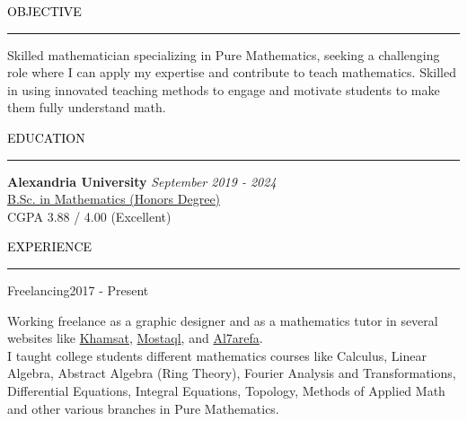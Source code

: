 \documentclass{resume} %
\renewenvironment{rSection}[1]{
\sectionskip
\textcolor{black}{\MakeUppercase{#1}}
\sectionlineskip
\hrule
\begin{list}{}{
\setlength{\leftmargin}{1.5em}
}
\item[]
}{
\end{list}
}
\begin{document}
\begin{rSection}{Objective}
     Skilled mathematician specializing in Pure Mathematics, seeking a challenging role where I can apply my expertise and contribute to teach mathematics. Skilled in using innovated teaching methods to engage and motivate students to make them fully understand math. 
\end{rSection}


\begin{rSection}{Education}
{\bf Alexandria University} \hfill {\em September 2019 - 2024} 
\\ \href{https://drive.google.com/file/d/1F50DDXvgqMtAoCs6Qjr5yMD2jWmPWW3m/view?usp=sharing}{\color{blue}B.Sc. in Mathematics (Honors Degree)} \hfill
\\ CGPA 3.88 / 4.00 (Excellent) \hfill
\end{rSection}



\begin{rSection}{Experience}
\begin{rSubsection}{Freelancing}{2017 - Present}{}{}
\item Working freelance as a graphic designer and as a mathematics tutor in several websites like \href{https://khamsat.com/user/hazem_hosam}{\color{blue}Khamsat}, \href{https://mostaql.com/u/Hazem_Hosam}{\color{blue}Mostaql}, 
 and \href{https://www.elharefa.com/en/freelancers/p/hazemhossam}{\color{blue}Al7arefa}.\\
 I taught college students different mathematics courses like Calculus, Linear Algebra, Abstract Algebra (Ring Theory), Fourier Analysis and Transformations, Differential Equations, Integral Equations, Topology, Methods of Applied Math and  other various branches in Pure Mathematics.
\end{rSubsection}
\end{rSection}
\end{document}

